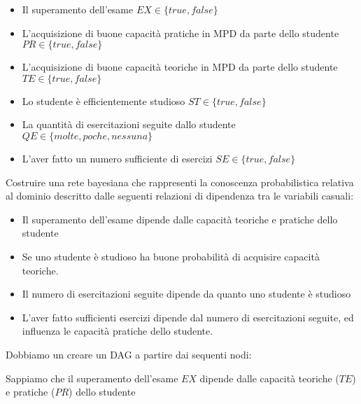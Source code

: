 \documentclass{article}
\begin{document}
\begin{itemize}
	\item Il superamento dell’esame \( EX \in \{true, false\} \ \)
	\item L’acquisizione di buone capacità pratiche in MPD da parte dello studente \( PR \in \{true, false\} \ \)
	\item L’acquisizione di buone capacità teoriche in MPD da parte dello studente \( TE \in \{true, false\} \ \)
	\item Lo studente è efficientemente studioso \( ST \in \{true, false\} \ \)
	\item La quantità di esercitazioni seguite dallo studente \( QE \in \{molte, poche, nessuna\} \ \)
	\item L’aver fatto un numero sufficiente di esercizi \( SE \in \{true, false\} \ \)
	
\end{itemize}

Costruire una rete bayesiana che rappresenti la conoscenza probabilistica relativa
al dominio descritto dalle seguenti relazioni di dipendenza tra le variabili casuali:

\begin{itemize}
	\item Il superamento dell’esame dipende dalle capacità
	teoriche e pratiche dello studente
	\item Se uno studente è studioso ha buone probabilità di acquisire
	capacità teoriche.
	\item Il numero di esercitazioni seguite dipende da quanto uno
	studente è studioso
	\item L’aver fatto sufficienti esercizi dipende dal numero di
	esercitazioni seguite, ed influenza le capacità pratiche dello
	studente.
\end{itemize}

Dobbiamo un creare un DAG a partire dai sequenti nodi: \\

\begin{center}
\end{center}
\pagebreak

Sappiamo che il superamento dell'esame \(EX\) dipende  dalle capacità teoriche (\(TE\)) e pratiche (\(PR\)) dello studente	
\end{document}
